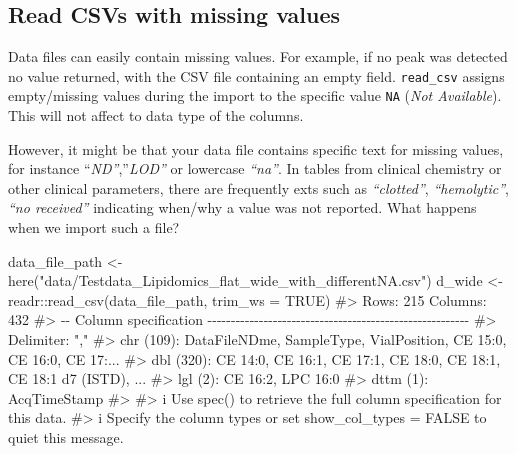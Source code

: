 \documentclass[
  letterpaper,
  DIV=11,
  numbers=noendperiod]{scrreprt}
\newenvironment{Shaded}{\begin{snugshade}}{\end{snugshade}}
\newcommand{\AttributeTok}[1]{\textcolor[rgb]{0.40,0.45,0.13}{#1}}
\newcommand{\CommentTok}[1]{\textcolor[rgb]{0.37,0.37,0.37}{#1}}
\newcommand{\ConstantTok}[1]{\textcolor[rgb]{0.56,0.35,0.01}{#1}}
\newcommand{\FunctionTok}[1]{\textcolor[rgb]{0.28,0.35,0.67}{#1}}
\newcommand{\NormalTok}[1]{\textcolor[rgb]{0.00,0.23,0.31}{#1}}
\newcommand{\OtherTok}[1]{\textcolor[rgb]{0.00,0.23,0.31}{#1}}
\newcommand{\SpecialCharTok}[1]{\textcolor[rgb]{0.37,0.37,0.37}{#1}}
\newcommand{\StringTok}[1]{\textcolor[rgb]{0.13,0.47,0.30}{#1}}
\begin{document}
\hypertarget{read-csvs-with-missing-values}{%
\subsection{Read CSVs with missing
values}\label{read-csvs-with-missing-values}}

Data files can easily contain missing values. For example, if no peak
was detected no value returned, with the CSV file containing an empty
field. \texttt{read\_csv} assigns empty/missing values during the import
to the specific value \texttt{NA} (\emph{Not Available}). This will not
affect to data type of the columns.

However, it might be that your data file contains specific text for
missing values, for instance ``\emph{ND''},''\emph{LOD''} or lowercase
\emph{``na''}. In tables from clinical chemistry or other clinical
parameters, there are frequently exts such as \emph{``clotted''},
\emph{``hemolytic''}, \emph{``no received''} indicating when/why a value
was not reported. What happens when we import such a file?

\begin{Shaded}
\begin{Highlighting}[]
\NormalTok{data\_file\_path }\OtherTok{\textless{}{-}} \FunctionTok{here}\NormalTok{(}\StringTok{"data/Testdata\_Lipidomics\_flat\_wide\_with\_differentNA.csv"}\NormalTok{)}
\NormalTok{d\_wide }\OtherTok{\textless{}{-}}\NormalTok{ readr}\SpecialCharTok{::}\FunctionTok{read\_csv}\NormalTok{(data\_file\_path, }\AttributeTok{trim\_ws =} \ConstantTok{TRUE}\NormalTok{)}
\CommentTok{\#\textgreater{} Rows: 215 Columns: 432}
\CommentTok{\#\textgreater{} {-}{-} Column specification {-}{-}{-}{-}{-}{-}{-}{-}{-}{-}{-}{-}{-}{-}{-}{-}{-}{-}{-}{-}{-}{-}{-}{-}{-}{-}{-}{-}{-}{-}{-}{-}{-}{-}{-}{-}{-}{-}{-}{-}{-}{-}{-}{-}{-}{-}{-}{-}{-}{-}{-}{-}{-}{-}{-}{-}}
\CommentTok{\#\textgreater{} Delimiter: ","}
\CommentTok{\#\textgreater{} chr  (109): DataFileNDme, SampleType, VialPosition, CE 15:0, CE 16:0, CE 17:...}
\CommentTok{\#\textgreater{} dbl  (320): CE 14:0, CE 16:1, CE 17:1, CE 18:0, CE 18:1, CE 18:1 d7 (ISTD), ...}
\CommentTok{\#\textgreater{} lgl    (2): CE 16:2, LPC 16:0}
\CommentTok{\#\textgreater{} dttm   (1): AcqTimeStamp}
\CommentTok{\#\textgreater{} }
\CommentTok{\#\textgreater{} i Use \textasciigrave{}spec()\textasciigrave{} to retrieve the full column specification for this data.}
\CommentTok{\#\textgreater{} i Specify the column types or set \textasciigrave{}show\_col\_types = FALSE\textasciigrave{} to quiet this message.}
\end{Highlighting}
\end{Shaded}
\end{document}
